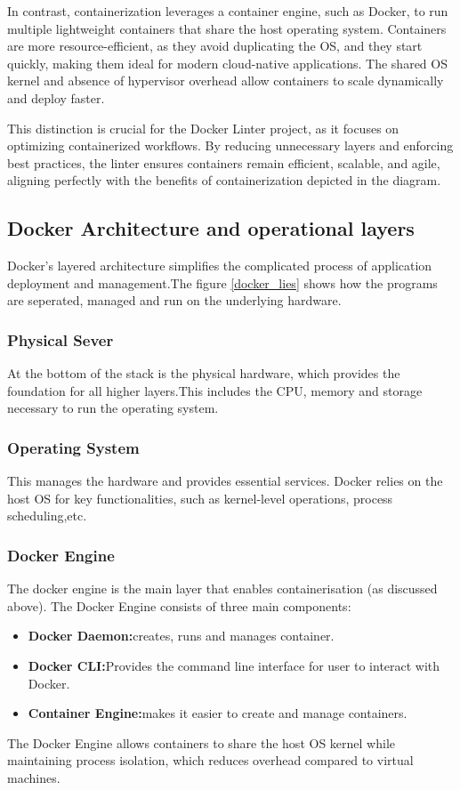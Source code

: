 In contrast, containerization leverages a container engine, such as Docker, to run multiple lightweight containers that share the host operating system. Containers are more resource-efficient, as they avoid duplicating the OS, and they start quickly, making them ideal for modern cloud-native applications. The shared OS kernel and absence of hypervisor overhead allow containers to scale dynamically and deploy faster.

This distinction is crucial for the Docker Linter project, as it focuses on optimizing containerized workflows. By reducing unnecessary layers and enforcing best practices, the linter ensures containers remain efficient, scalable, and agile, aligning perfectly with the benefits of containerization depicted in the diagram.

\subsection{Docker Architecture and operational layers}
Docker's layered architecture simplifies the complicated process of application deployment and management.The figure \ref{docker_lies} shows how the programs are seperated, managed and run on the underlying hardware.

\subsubsection{Physical Sever}
At the bottom of the stack is the physical hardware, which provides the foundation for all higher layers.This includes the CPU, memory and storage necessary to run the operating system. 
\subsubsection{Operating System}
This manages the hardware and provides essential services. Docker relies on the host OS for key functionalities, such as kernel-level operations, process scheduling,etc. 
\subsubsection{Docker Engine}
The docker engine is the main layer that enables containerisation (as discussed above). The Docker Engine consists of three main components: 
\begin{itemize}
    \item \textbf{Docker Daemon:}creates, runs and manages container.
    \item \textbf{Docker CLI:}Provides the command line interface for user to interact with Docker.
    \item \textbf{Container Engine:}makes it easier to create and manage containers.\cite{schenker2020learn}
\end{itemize}
The Docker Engine allows containers to share the host OS kernel while maintaining process isolation, which reduces overhead compared to virtual machines.
